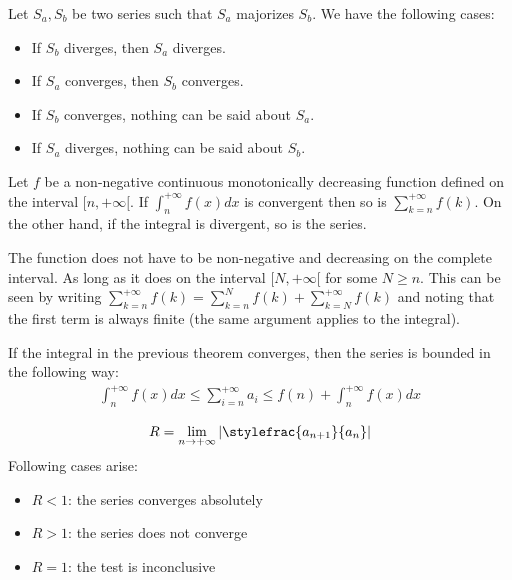 	\begin{method}
		Let $S_a, S_b$ be two series such that $S_a$ majorizes $S_b$. We have the following cases:
	        \begin{itemize}
			\item If $S_b$ diverges, then $S_a$ diverges.
        		\item If $S_a$ converges, then $S_b$ converges.
		        \item If $S_b$ converges, nothing can be said about $S_a$.
		        \item If $S_a$ diverges, nothing can be said about $S_b$. 
		\end{itemize}
	\end{method}

	\begin{method}
		Let $f$ be a non-negative continuous monotonically decreasing function defined on the interval $[n,+\infty[$. If $\int_n^{+\infty}f(x)dx$ is convergent then so is $\sum_{k=n}^{+\infty}f(k)$. On the other hand, if the integral is divergent, so is the series.
	\end{method}
    	\begin{remark}
    		The function does not have to be non-negative and decreasing on the complete interval. As long as it does on the interval $[N,+\infty[$ for some $N\geq n$. This can be seen by writing $\sum_{k=n}^{+\infty}f(k) = \sum_{k=n}^Nf(k) + \sum_{k=N}^{+\infty}f(k)$ and noting that the first term is always finite (the same argument applies to the integral).
    	\end{remark}
    
	\begin{property}
		If the integral in the previous theorem converges, then the series is bounded in the following way:
	        \begin{gather}
			\int_n^{+\infty}f(x)dx \leq \sum_{i=n}^{+\infty}a_i \leq f(n) + \int_n^{+\infty}f(x)dx
		\end{gather}
	\end{property}

	\begin{method}
		\begin{gather}
			R = \lim_{n\rightarrow+\infty}\left|\stylefrac{a_{n+1}}{a_n}\right|
		\end{gather}
		Following cases arise:
	        \begin{itemize}
			\item $R < 1$: the series converges absolutely
		        \item $R > 1$: the series does not converge
		        \item $R = 1$: the test is inconclusive
		\end{itemize}
	\end{method}

